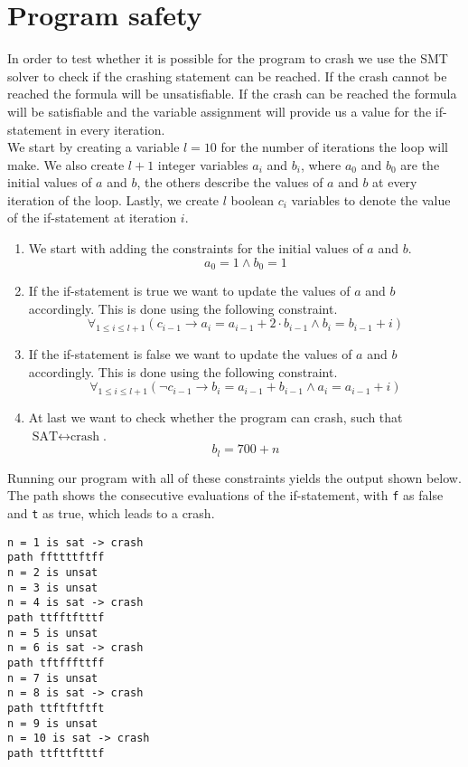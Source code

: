 \documentclass{scrartcl}
\begin{document}
\section{Program safety}
In order to test whether it is possible for the program to crash we use the SMT
solver to check if the crashing statement can be reached. If the crash cannot
be reached the formula will be unsatisfiable. If the crash can be reached the
formula will be satisfiable and the variable assignment will provide us a value
for the if-statement in every iteration.
\\

We start by creating a variable $l = 10$ for the number of iterations the loop
will make. We also create $l + 1$ integer variables $a_i$ and $b_i$, where
$a_0$ and $b_0$ are the initial values of $a$ and $b$, the others describe the
values of $a$ and $b$ at every iteration of the loop. Lastly, we create $l$
boolean $c_i$ variables to denote the value of the if-statement at iteration
$i$.

\begin{enumerate}
	\item
		We start with adding the constraints for the initial values of $a$ and $b$.
		$$a_0 = 1 \land b_0 = 1$$

	\item
		If the if-statement is true we want to update the values of $a$ and $b$
		accordingly. This is done using the following constraint.
		\[
			\forall_{1 \leq i \leq l + 1}
			\left ( c_{i-1} \to
				a_i = a_{i-1} + 2 \cdot b_{i-1} \land
				b_i = b_{i-1} + i
			\right )
		\]
	\item
		If the if-statement is false we want to update the values of $a$ and $b$
		accordingly. This is done using the following constraint.
		\[
			\forall_{1 \leq i \leq l + 1}
			\left ( \lnot c_{i-1} \to
				b_i = a_{i-1} + b_{i-1} \land
				a_i = a_{i-1} + i
			\right )
		\]
	\item
		At last we want to check whether the program can crash, such that
		$\text{SAT} \leftrightarrow \text{crash}$.
		\[ b_l = 700 + n \]
\end{enumerate}

Running our program with all of these constraints yields the output shown
below. The path shows the consecutive evaluations of the if-statement, with
\texttt{f} as false and \texttt{t} as true, which leads to a crash.

\begin{verbatim}
n = 1 is sat -> crash
path ffttttftff
n = 2 is unsat
n = 3 is unsat
n = 4 is sat -> crash
path ttfftftttf
n = 5 is unsat
n = 6 is sat -> crash
path tftfffttff
n = 7 is unsat
n = 8 is sat -> crash
path ttftftftft
n = 9 is unsat
n = 10 is sat -> crash
path ttfttftttf
\end{verbatim}
\end{document}
